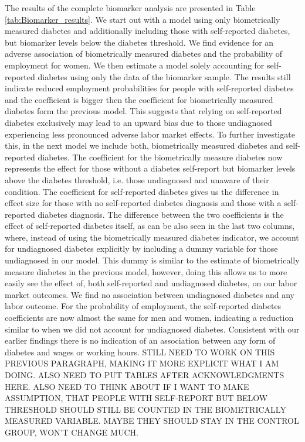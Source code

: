 \documentclass[12pt,english]{article}
\begin{document}
The results of the complete biomarker analysis are presented in Table \ref{tab:Biomarker_results}. We start out with a model using only biometrically measured diabetes and additionally including those with self-reported diabetes, but biomarker levels below the diabetes threshold. We find evidence for an adverse association of biometrically measured diabetes and the probability of employment for women. We then estimate a model solely accounting for self-reported diabetes using only the data of the biomarker sample. The results still indicate reduced employment probabilities for people with self-reported diabetes and the coefficient is bigger then the coefficient for biometrically measured diabetes form the previous model. This suggests that relying on self-reported diabetes exclusively may lead to an upward bias due to those undiagnosed experiencing less pronounced adverse labor market effects. To further investigate this, in the next model we include both, biometrically measured diabetes and self-reported diabetes. The coefficient for the biometrically measure diabetes now represents the effect for those without a diabetes self-report but biomarker levels above the diabetes threshold, i.e. those undiagnosed and unaware of their condition. The coefficient for self-reported diabetes gives us the difference in effect size for those with no self-reported diabetes diagnosis and those with a self-reported diabetes diagnosis. The difference between the two coefficients is the effect of self-reported diabetes itself, as can be also seen in the last two columns, where, instead of using the biometrically measured diabetes indicator, we account for undiagnosed diabetes explicitly by including a dummy variable for those undiagnosed in our model. This dummy is similar to the estimate of biometrically measure diabetes in the previous model, however, doing this allows us to more easily see the effect of, both self-reported and undiagnosed diabetes, on our labor market outcomes. We find no association between undiagnosed diabetes and any labor outcome. For the probability of employment, the self-reported diabetes coefficients are now almost the same for men and women, indicating a reduction similar to when we did not account for undiagnosed diabetes. Consistent with our earlier findings there is no indication of an association between any form of diabetes and wages or working hours. STILL NEED TO WORK ON THIS PREVIOUS PARAGRAPH, MAKING IT MORE EXPLICIT WHAT I AM DOING. ALSO NEED TO PUT TABLES AFTER ACKNOWLEDGMENTS HERE. ALSO NEED TO THINK ABOUT IF I WANT TO MAKE ASSUMPTION, THAT PEOPLE WITH SELF-REPORT BUT BELOW THRESHOLD SHOULD STILL BE COUNTED IN THE BIOMETRICALLY MEASURED VARIABLE. MAYBE THEY SHOULD STAY IN THE CONTROL GROUP, WON'T CHANGE MUCH.
 
\end{document}
